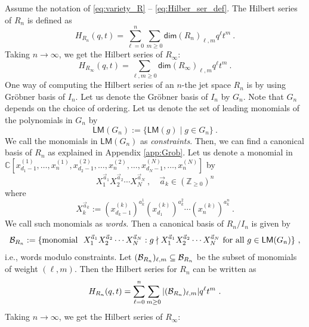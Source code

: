 \documentclass[a4paper,10pt]{article}
\newcommand{\C}{\mathds{C}}
\newcommand{\mr}[1]{\mathsf{#1}}
\def\CB{{\cal B}}
\def\CB {{\cal B}}
\def\IZ{{\mathds{Z}}}
\begin{document}
Assume the notation of \eqref{eq:variety_R} -- \eqref{eq:Hilber_ser_def}. The Hilbert series of $R_n$ is defined as
\begin{equation}
H_{R_n}(q, t)=\sum_{\ell=0}^n \sum_{m \geq 0} \mr{dim}\left(R_n\right)_{\ell, m} q^{\ell} t^m~.
\end{equation}
Taking $n \rightarrow \infty$, we get the Hilbert series of  $R_{\infty}$:
\begin{equation}
H_{R_{\infty}}(q, t)=\sum_{\ell, m \geq 0} \mr{dim}\left(R_{\infty}\right)_{\ell, m} q^{\ell} t^m~.
\end{equation}
One way of computing the Hilbert series of an $n$-the jet space $R_n$ is by using Gr\"{o}bner basis of $I_n$.
Let us denote the Gr\"{o}bner basis of $I_n$ by $G_n$. Note that $G_n$ depends on the choice of ordering. Let us denote the set of leading monomials of the polynomials in $G_n$ by
\begin{equation}
\mr{LM}(G_n):=\{\mr{LM}(g)\mid g\in G_n\}~.
\end{equation}
We call the monomials in $\mr{LM}(G_n)$ as \textit{constraints}. 
Then, we can find a canonical basis of $R_n$ as explained in Appendix \ref{app:Grob}. Let us denote a monomial in $\C[x^{(1)}_{d_1-1},\dots,x^{(1)}_n,x^{(2)}_{d_2-1},\dots,x^{(2)}_n,\dots,x^{(N)}_{d_N-1},\dots,x^{(N)}_n]$ by
\begin{equation}
    X_1^{\vec{a}_1}X_2^{\vec{a}_2}\cdots X_N^{\vec{a}_N}~,\quad \vec{a}_k\in (\IZ_{\geq 0})^n
\end{equation}
where
\begin{equation}
    X_k^{\vec{a}_k}:=(x_{d_k-1}^{(k)})^{a_k^1}(x_{d_1}^{(k)})^{a_k^2}\cdots (x_n^{(k)})^{a_k^n}~.
\end{equation}
We call such monomials as \textit{words}. 
Then a canonical basis of $R_n/I_n$ is given by 
\begin{equation}\label{eq:basis_Rn/I_n}
    \CB_{R_n}:=\{\text{monomial}~~X_1^{\vec{a}_1}X_2^{\vec{a}_2}\cdots X_N^{\vec{a}_N}:g\nmid X_1^{\vec{a}_1}X_2^{\vec{a}_2}\cdots X_N^{\vec{a}_N}\text{ for all }g\in \mr{LM}(G_n)\}~,
\end{equation}
i.e., words modulo constraints. 
Let $(\CB_{R_n})_{\ell,m}\subseteq \CB_{R_n}$ be the subset of monomials of weight $(\ell,m)$. Then the Hilbert series for $R_n$ can be written as 
\begin{equation}
H_{R_n}(q, t)=\sum_{\ell=0}^n \sum_{m \geq 0} |(\CB_{R_n})_{\ell,m}|q^{\ell} t^m~.
\end{equation}
Taking $n \rightarrow \infty$, we get the Hilbert series of  $R_{\infty}$:
\end{document}

